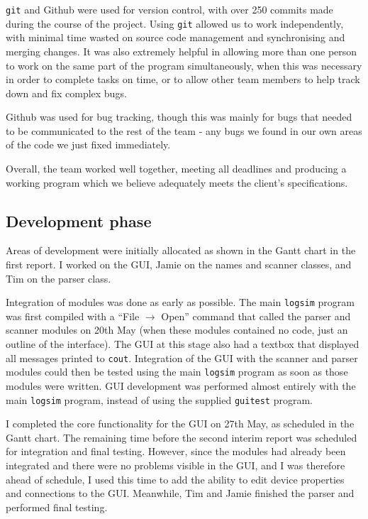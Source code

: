 \documentclass[a4paper,10pt]{article}
\begin{document}
\texttt{git} and Github were used for version control, with over 250 commits made during the course of the project. Using \texttt{git} allowed us to work independently, with minimal time wasted on source code management and synchronising and merging changes. It was also extremely helpful in allowing more than one person to work on the same part of the program simultaneously, when this was necessary in order to complete tasks on time, or to allow other team members to help track down and fix complex bugs.

Github was used for bug tracking, though this was mainly for bugs that needed to be communicated to the rest of the team - any bugs we found in our own areas of the code we just fixed immediately.

Overall, the team worked well together, meeting all deadlines and producing a working program which we believe adequately meets the client's specifications. 

\subsection{Development phase}
Areas of development were initially allocated as shown in the Gantt chart in the first report. I worked on the GUI, Jamie on the names and scanner classes, and Tim on the parser class. 

Integration of modules was done as early as possible. The main \texttt{logsim} program was first compiled with a ``File $\rightarrow$ Open'' command that called the parser and scanner modules on 20th May (when these modules contained no code, just an outline of the interface). The GUI at this stage also had a textbox that displayed all messages printed to \texttt{cout}. Integration of the GUI with the scanner and parser modules could then be tested using the main \texttt{logsim} program as soon as those modules were written. GUI development was performed almost entirely with the main \texttt{logsim} program, instead of using the supplied \texttt{guitest} program. 

I completed the core functionality for the GUI on 27th May, as scheduled in the Gantt chart. The remaining time before the second interim report was scheduled for integration and final testing. However, since the modules had already been integrated and there were no problems visible in the GUI, and I was therefore ahead of schedule, I used this time to add the ability to edit device properties and connections to the GUI. Meanwhile, Tim and Jamie finished the parser and performed final testing. 
\end{document}
